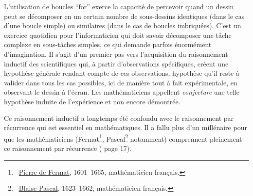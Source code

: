 {\begin{minipage}{\myparboxwidth}
L'utilisation de boucles ``for'' exerce la capacité de percevoir
quand un dessin peut se décomposer en un certain nombre de sous-dessins
identiques (dans le cas d'une boucle simple) ou similaires (dans le cas
de boucles imbriquées). C'est un exercice quotidien pour l'informaticien
qui doit savoir décomposer une tâche complexe en sous-tâches simples,
ce qui demande parfois énormément d'imagination.
Il s'agit d'un premier pas vers l'acquisition du raisonnement
inductif des scien\-ti\-fi\-ques qui, à partir d'observations spécifiques,
créent une hypothèse générale rendant compte de ces observations,
hypothèse qu'il reste à valider dans tous les cas possibles, ici de
manière tout à fait expérimentale, en observant le dessin à
l'écran. Les mathématiciens appellent {\em conjecture} une telle
hypothèse induite de l'expérience et non encore démontrée.

Ce raisonnement inductif a longtemps été confondu avec le raisonnement
par récurrence qui est essentiel en mathématiques. Il a fallu plus d'un
millénaire pour que les mathématiciens
(Fermat\footnote{\ \href{https://en.wikipedia.org/wiki/Pierre_de_Fermat}{Pierre de Fermat}, 1601--1665, mathématicien français.},
Pascal\footnote{\ \href{https://en.wikipedia.org/wiki/Blaise_Pascal}{Blaise Pascal}, 1623--1662, mathématicien français.}
notamment) comprennent
pleinement ce raisonnement par récurrence (\cite{knuth2} page 17).
\end{minipage}
}

